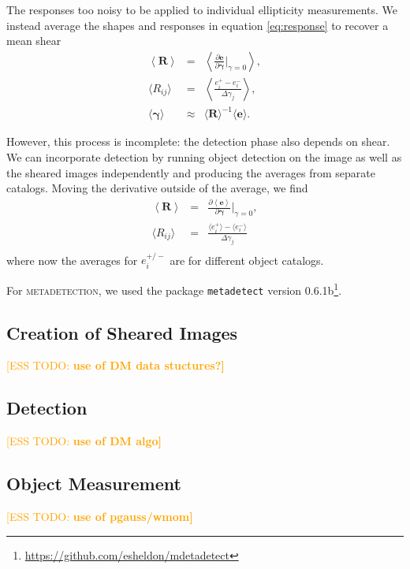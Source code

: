 \documentclass[iop, twocolappendix, appendixfloats, numberedappendix, apj]{hackemulateapj}
\newcommand{\esstodo}[1]{\textcolor{orange}{[ESS TODO: \bf #1]}}
\newcommand{\mdet}{\textsc{metadetection}}
\begin{document}
The responses too noisy to be applied to individual ellipticity measurements.
We instead average the shapes and responses in equation \ref{eq:response} to
recover a mean shear
\begin{eqnarray}
    \left< \boldsymbol{R} \right> &=& \left< \frac{\partial \boldsymbol{e} }{\partial \boldsymbol{\gamma} } \biggr\rvert_{\gamma=0} \right>, \nonumber \\
    \langle R_{ij}\rangle &=& \left< \frac{e_i^{+} - e_i^{-}}{\Delta\gamma_j} \right>, \nonumber \\
    \langle \boldsymbol\gamma \rangle & \approx & \langle \boldsymbol{R}\rangle^{-1}\langle\boldsymbol{e}\rangle.
\end{eqnarray}

However, this process is incomplete:  the detection phase also depends on
shear.  We can incorporate detection by running object detection on the image
as well as the sheared images independently and producing the averages from
separate catalogs.  Moving the derivative outside of the average, we find
\begin{eqnarray} \label{eq:fullR}
    \left< \boldsymbol{R} \right> &=& \frac{\partial \left< \boldsymbol{e} \right> }{\partial \boldsymbol{\gamma} } \biggr\rvert_{\gamma=0},  \nonumber \\
    \langle R_{ij}\rangle &=& \frac{\langle e_i^{+}\rangle - \langle e_i^{-}\rangle}{\Delta\gamma_j} \nonumber \\
\end{eqnarray}
where now the averages for $e_i^{+/-}$ are for different object catalogs.

For \mdet, we used the package \texttt{metadetect} version
0.6.1b\footnote{\url{https://github.com/esheldon/mdetadetect}}.

\subsection{Creation of Sheared Images} \label{sec:mdet:sheared}
\esstodo{use of DM data stuctures?}

\subsection{Detection} \label{sec:mdet:detect}
\esstodo{use of DM algo}

\subsection{Object Measurement} \label{sec:mdet:meas}
\esstodo{use of pgauss/wmom}
\end{document}

